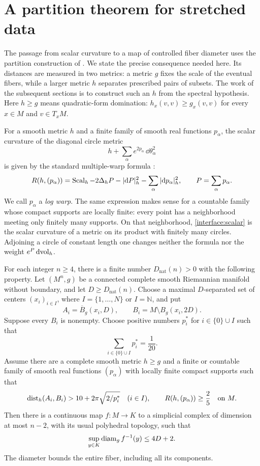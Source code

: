 \section{A partition theorem for stretched data}\label{sec:interface}

The passage from scalar curvature to a map of controlled fiber diameter
uses the partition construction of \cite{OpenAIWidth}.  We state the
precise consequence needed here.  Its distances are measured in two
metrics: a metric $g$ fixes the scale of the eventual fibers, while a
larger metric $h$ separates prescribed pairs of subsets.  The work of
the subsequent sections is to construct such an $h$ from the spectral
hypothesis.  Here $h\ge g$ means quadratic-form domination:
$h_x(v,v)\ge g_x(v,v)$ for every $x\in M$ and $v\in T_xM$.

For a smooth metric $h$ and a finite family of smooth real functions
$p_\alpha$, the scalar curvature of the diagonal circle metric
\[
 h+\sum_\alpha e^{2p_\alpha}\,\dd\theta_\alpha^2
\]
is given by the standard multiple-warp formula
\cite[Section~1.A]{Gromov2024}:
\begin{equation}\label{interface:scalar}
 R(h,(p_\alpha))
 =\operatorname{Scal}_h-2\Delta_h P-|\mathrm d P|_h^2
                  -\sum_\alpha|\mathrm d p_\alpha|_h^2,
 \qquad P=\sum_\alpha p_\alpha.
\end{equation}
We call $p_\alpha$ a \emph{log warp}.  The same expression makes sense
for a countable family whose compact supports are locally finite:
every point has a neighborhood meeting only finitely many supports.
On that neighborhood, \eqref{interface:scalar} is the scalar curvature
of a metric on its product with finitely many circles.  Adjoining a circle of
constant length one changes neither the formula nor the weight
$e^P\,\mathrm d\mathrm{vol}_h$.

\begin{theorem}
\label{interface:width}
For each integer $n\ge4$, there is a finite number $D_{\mathrm{nat}}(n)>0$
with the following property.  Let $(M^n,g)$ be a connected complete smooth
Riemannian manifold without boundary, and let $D\ge D_{\mathrm{nat}}(n)$.
Choose a maximal $D$-separated set of centers $(x_i)_{i\in I}$, where
$I=\{1,\ldots,N\}$ or $I=\mathbb N$, and put
\[
 A_i=\overline B_g(x_i,D),\qquad
 B_i=M\setminus B_g(x_i,2D).
\]
Suppose every $B_i$ is nonempty.  Choose positive numbers $p_i^*$ for
$i\in\{0\}\cup I$ such that
\[
 \sum_{i\in\{0\}\cup I}p_i^*=\frac1{20}.
\]
Assume there are a complete smooth metric $h\ge g$ and a finite or
countable family of smooth real functions $(p_\alpha)$ with locally
finite compact supports such that
\begin{equation}\label{interface:width-hypothesis}
 \operatorname{dist}_h(A_i,B_i)>10+2\pi\sqrt{2/p_i^*}\quad(i\in I),
 \qquad R(h,(p_\alpha))\ge\frac25\quad\hbox{on }M.
\end{equation}
Then there is a continuous map $f:M\to K$ to a simplicial complex of
dimension at most $n-2$, with its usual polyhedral topology, such that
\[
 \sup_{y\in K}\operatorname{diam}_g f^{-1}(y)\le4D+2.
\]
The diameter bounds the entire fiber, including all its components.
\end{theorem}

